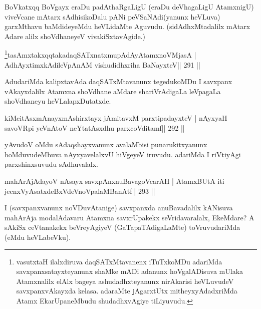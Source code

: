 \begin{artha}
BoVkatxqq BoVgayx eraDu padAthaRgaLigU (eraDu deVhagaLigU AtamxnigU) viveVcane mAtarx sAdhisikoDalu pANi peVSaNAdi(yanunx heVLuva) garxMthavu baMdideyeMdu heVLidaMte Aguvudu. (sidAdhxMtadalilx mAtarx  \mdash  Adare alilx shoVdhaneyeV vivakiSxtavAgide.)
\end{artha}

\begin{shl}
\footnote{vasutxtaH ilalxdiruva daqSATxMtavanenx iTuTxkoMDu  adariMda savxpanxsatayxteyanunx shaMke mADi adanunx hoVgalADisuva mUlaka Atamxnalilx elAlx bageya ashudadhxteyanunx nirAkarisi heVLuvudeV savxpanxvAkayxda kelasa. adaraMte jAgarxtUtx mitheyxyAdadxriMda Atamx EkarUpaneMbudu shudadhxvAgiye tiLiyuvudu.}tasAmxtakxqqtakadaqSATxnatxmupAdAyA\s\s tamxnoV\s MjasA |
AdhAyxtimxkAdileVpAnAM vishudidhxriha BaNayxteV\hfill || 291 ||
\end{shl}

\begin{artha}
AdudariMda kalipxtavAda daqSATxMtavanunx tegedukoMDu I savxpanx vAkayxdalilx Atamxna shoVdhane aMdare shariVrAdigaLa leVpagaLa shoVdhaneyu heVLalapxDutatxde.
\end{artha}


\begin{shl}
kiMcitAsxmAnayxmAshirxtayx jAmitavxM parxtipadayxteV |
nAyxyaH savoVR\s pi yeVnAtoV neYtatAsxdhu parxcoVditamf\hfill || 292 ||
\end{shl}

\begin{artha}
yAvudoV oMdu sAdaqshayxvanunx avalaMbisi punarukitxyanunx  hoMduvudeMbuva nAyxyavelalxvU hiVgeyeV iruvudu. adariMda I riVtiyAgi parxshinxsuvudu sAdhuvalalx.
\end{artha}


\begin{shl}
mahArAjAdayoV nAsayx savxpAnxnuBavagoVcarAH |
AtamxBUtA iti jecnxVyAsatxdeBxVdeVnoVpalaMBanAtf\hfill || 293 ||
\end{shl}

\begin{artha}
I (savxpanxvanunx noVDuvAtanige) savxpanxda anuBavadalilx kANisuva mahArAja modalAdavaru Atamxna savxrUpakekx seVridavaralalx, EkeMdare? A sAkiSx ceVtanakekx beVreyAgiyeV (GaTapaTAdigaLaMte) toVruvudariMda (eMdu heVLabeVku).
\end{artha}

